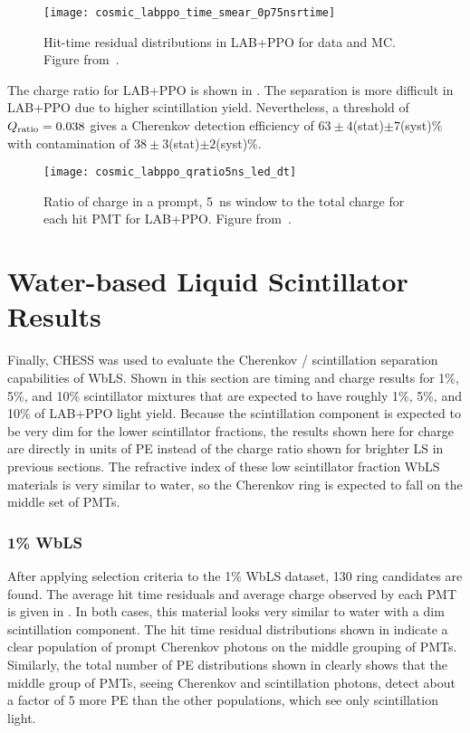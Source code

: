 \begin{figure}
	\centering
	\texttt{[image: cosmic\_labppo\_time\_smear\_0p75nsrtime]}
	\caption{Hit-time residual distributions in LAB+PPO for data and MC. Figure from~\cite{chess_lab}.}
	\label{fig:labppo}
\end{figure}

The charge ratio for LAB+PPO is shown in . 
The separation is more difficult in LAB+PPO due to higher scintillation yield.  
Nevertheless, a threshold of $Q_{\rm ratio}=0.038$ gives a Cherenkov detection efficiency of $63\pm4$(stat)$\pm7$(syst)\% with contamination of $38\pm3$(stat)$\pm2$(syst)\%.

\begin{figure}
	\centering
	\texttt{[image: cosmic\_labppo\_qratio5ns\_led\_dt]}
	\caption{Ratio of charge in a prompt, 5~ns window to the total charge for each hit PMT for LAB+PPO. Figure from~\cite{chess_lab}.}
	\label{f:labppoQ}
\end{figure}

\clearpage

\section{Water-based Liquid Scintillator Results}
\label{sec:wbls}

Finally, CHESS was used to evaluate the Cherenkov / scintillation separation capabilities of WbLS.
Shown in this section are timing and charge results for 1\%, 5\%, and 10\% scintillator mixtures that are expected to have roughly 1\%, 5\%, and 10\% of LAB+PPO light yield.
Because the scintillation component is expected to be very dim for the lower scintillator fractions, the results shown here for charge are directly in units of PE instead of the charge ratio shown for brighter LS in previous sections.
The refractive index of these low scintillator fraction WbLS materials is very similar to water, so the Cherenkov ring is expected to fall on the middle set of PMTs.

\subsubsection{1\% WbLS}

After applying selection criteria to the 1\% WbLS dataset, 130 ring candidates are found.
The average hit time residuals and average charge observed by each PMT is given in .
In both cases, this material looks very similar to water with a dim scintillation component.
The hit time residual distributions shown in  indicate a clear population of prompt Cherenkov photons on the middle grouping of PMTs.
Similarly, the total number of PE distributions shown in  clearly shows that the middle group of PMTs, seeing Cherenkov and scintillation photons, detect about a factor of 5 more PE than the other populations, which see only scintillation light.

